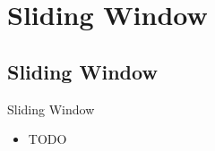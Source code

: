 \section{Sliding Window}

\subsection{Sliding Window}

\begin{frame}{Sliding Window}
    \begin{itemize}
        \item TODO
    \end{itemize}
\end{frame}